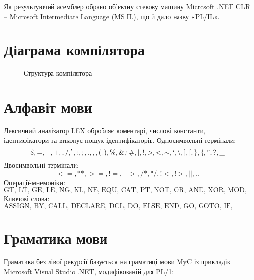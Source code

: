 \documentclass{memoir}
\begin{document}
Як результуючий асемблер обрано об’єктну стекову машину Microsoft .NET CLR – Microsoft Intermediate Language (MS IL), що й дало назву «PL/IL».

\section{Діаграма компілятора}
\begin{figure}[h]
    \centering
    \caption{Структура компілятора}
\end{figure}

\section{Алфавіт мови}
Лексичний аналізатор LEX обробляє коментарі, числові константи, ідентифікатори та виконує пошук ідентифікаторів. Односимвольні термінали:
\[
\$, =, -, +, \*, /, ', :, ;, ., ,, (, ), \%, \&, ^, \#, |, !, >, <, \sim, `, \backslash, ], [, \}, \{, ", ?, \_
\]
Двосимвольні термінали:
\[
<=, **, >=, !=, ->, /*, */, !<, !>, ||, ..
\]
Операції-мнемоніки:
\[
\text{GT, LT, GE, LE, NG, NL, NE, EQU, CAT, PT, NOT, OR, AND, XOR, MOD, DIV, MUL, PLUS, MINUS}
\]
Ключові слова:
\[
\text{ASSIGN, BY, CALL, DECLARE, DCL, DO, ELSE, END, GO, GOTO, IF, INITIAL, LABEL, LITERALLY, OPTIONS, PROCEDURE, PROC, RECURSIVE, RETURNS, RETURN, THEN, TO, WHILE, CASE, BINARY, DECIMAL, FIXED, FLOAT, REAL, COMPLEX, VOID}
\]

\section{Граматика мови}
Граматика без лівої рекурсії базується на граматиці мови MyC із прикладів Microsoft Visual Studio .NET, модифікованій для PL/1:
\end{document}
